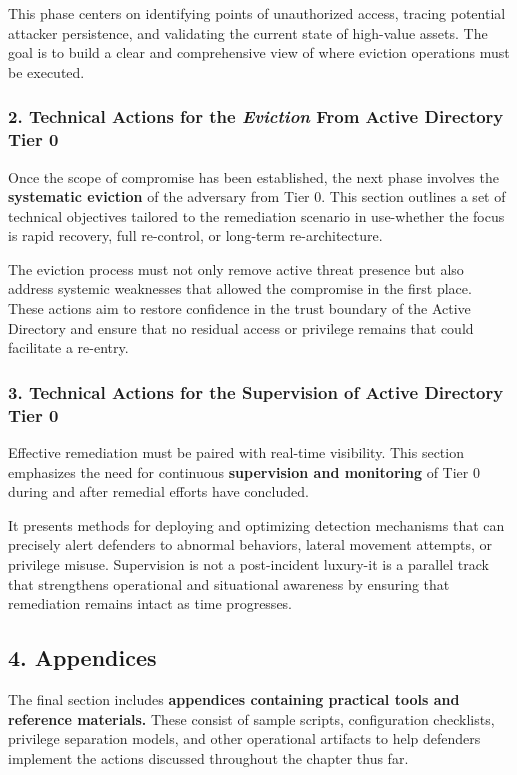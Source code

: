 This phase centers on identifying points of unauthorized access, tracing potential attacker persistence, and validating the current state of high-value assets. The goal is to build a clear and comprehensive view of where eviction operations must be executed.

\subsubsection{2. Technical Actions for the \textit{Eviction} From Active Directory Tier 0}
Once the scope of compromise has been established, the next phase involves the \textbf{systematic eviction} of the adversary from Tier 0. This section outlines a set of technical objectives tailored to the remediation scenario in use-whether the focus is rapid recovery, full re-control, or long-term re-architecture.

The eviction process must not only remove active threat presence but also address systemic weaknesses that allowed the compromise in the first place. These actions aim to restore confidence in the trust boundary of the Active Directory and ensure that no residual access or privilege remains that could facilitate a re-entry.

\subsubsection{3. Technical Actions for the Supervision of Active Directory Tier 0}
Effective remediation must be paired with real-time visibility. This section emphasizes the need for continuous \textbf{supervision and monitoring} of Tier 0 during and after remedial efforts have concluded.

It presents methods for deploying and optimizing detection mechanisms that can precisely alert defenders to abnormal behaviors, lateral movement attempts, or privilege misuse. Supervision is not a post-incident luxury-it is a parallel track that strengthens operational and situational awareness by ensuring that remediation remains intact as time progresses.

\subsection{4. Appendices}
The final section includes \textbf{appendices containing practical tools and reference materials.} These consist of sample scripts, configuration checklists, privilege separation models, and other operational artifacts to help defenders implement the actions discussed throughout the chapter thus far.

